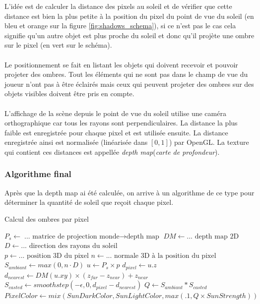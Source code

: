 \documentclass[11pt]{article} %
\begin{document}
L'idée est de calculer la distance des pixels au soleil et de vérifier que cette distance est bien la plus petite à la position du pixel du point de vue du soleil (en bleu et orange sur la figure \ref{fig:shadows_schema}), si ce n'est pas le cas cela signifie qu'un autre objet est plus proche du soleil et donc qu'il projète une ombre sur le pixel (en vert sur le schéma).

\paragraph{}
Le positionnement se fait en listant les objets qui doivent recevoir et pouvoir projeter des ombres. Tout les éléments qui ne sont pas dans le champ de vue du joueur n'ont pas à être éclairés mais ceux qui peuvent projeter des ombres sur des objets visibles doivent être pris en compte.
\paragraph{}
L'affichage de la scène depuis le point de vue du soleil utilise une caméra orthographique car tous les rayons sont perpendiculaires. La distance la plus faible est enregistrée pour chaque pixel et est utilisée ensuite. La distance enregistrée ainsi est normalisée (linéarisée dans $[0,1]$) par OpenGL. La texture qui contient ces distances est appellée \textit{depth map}(\textit{carte de profondeur}).

\subsubsection{Algorithme final}

Après que la depth map ai été calculée, on arrive à un algorithme de ce type pour déterminer la quantité de soleil que reçoit chaque pixel.
\begin{algorithm}
\caption{Calcul des ombres par pixel}
\begin{algorithmic}
\State $P_s \gets \text{... matrice de projection monde$\rightarrow$depth map}$
\State $DM \gets \text{... depth map 2D}$
\State $D \gets \text{... direction des rayons du soleil}$
\\
\State $p \gets \text{...  position 3D du pixel}$
\State $n \gets \text{... normale 3D à la position du pixel}$
\\
\State $S_{ambiant} \gets max(0, n\cdot D)$
\State $u \gets P_s\times p$
\State $d_{pixel} \gets u.z$
\State $d_{nearest} \gets DM(u.xy)\times(z_{far}-z_{near})+z_{near}$
\State $S_{casted} \gets smoothstep(-\epsilon, 0, d_{pixel}-d_{nearest})$
\State $Q \gets S_{ambiant}*S_{casted}$
\\
\State $PixelColor\gets mix(SunDarkColor, SunLightColor, max(.1, Q\times SunStrength))$
\end{algorithmic}
\end{algorithm}
\end{document}
